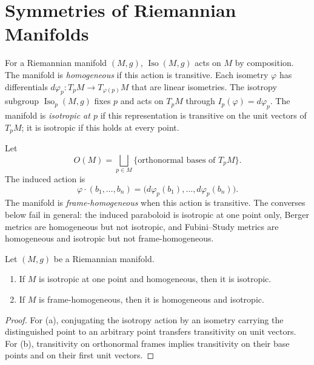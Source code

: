 
\section{Symmetries of Riemannian Manifolds}

For a Riemannian manifold $(M,g)$, $\operatorname{Iso}(M,g)$ acts on $M$ by composition. The manifold is \emph{homogeneous} if this action is transitive. Each isometry $\varphi$ has differentials $d\varphi_p:T_pM\to T_{\varphi(p)}M$ that are linear isometries. The isotropy subgroup $\operatorname{Iso}_p(M,g)$ fixes $p$ and acts on $T_pM$ through $I_p(\varphi)=d\varphi_p$. The manifold is \emph{isotropic at $p$} if this representation is transitive on the unit vectors of $T_pM$; it is isotropic if this holds at every point.

Let
\[
O(M)=\bigsqcup_{p\in M}\{\text{orthonormal bases of }T_pM\}.
\]
The induced action is
\begin{equation}
\varphi\cdot(b_1,\ldots,b_n)=\bigl(d\varphi_p(b_1),\ldots,d\varphi_p(b_n)\bigr).\tag{3.1}
\end{equation}
The manifold is \emph{frame-homogeneous} when this action is transitive. The converses below fail in general: the induced paraboloid is isotropic at one point only, Berger metrics are homogeneous but not isotropic, and Fubini--Study metrics are homogeneous and isotropic but not frame-homogeneous.

\begin{proposition}\label{prop:frame-homogeneous-manifolds}
Let $(M,g)$ be a Riemannian manifold.
\begin{enumerate}
\item[(a)] If $M$ is isotropic at one point and homogeneous, then it is isotropic.
\item[(b)] If $M$ is frame-homogeneous, then it is homogeneous and isotropic.
\end{enumerate}
\end{proposition}
\begin{proof}
\sketch For (a), conjugating the isotropy action by an isometry carrying the
distinguished point to an arbitrary point transfers transitivity on unit
vectors. For (b), transitivity on orthonormal frames implies transitivity on
their base points and on their first unit vectors.
\end{proof}

